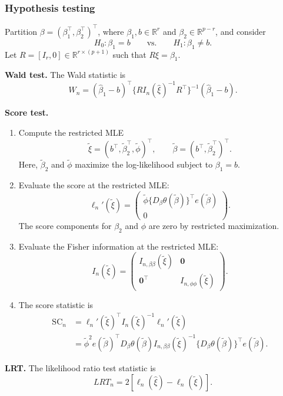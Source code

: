 \documentclass{article}
\theoremstyle{break}
\newcommand{\R}{\ensuremath{\mathbb{R}}}
\begin{document}
\subsubsection{Hypothesis testing}
Partition $\beta=(\beta_1^\top,\beta_2^\top)^\top$, where $\beta_1,b\in\R^r$ and $\beta_2\in\R^{p-r}$, and consider
\[
  H_0:\beta_1=b
  \qquad\text{vs.}\qquad
  H_1:\beta_1\ne b.
\]
Let $R=[I_r,0] \in \R^{r \times (p+1)}$ such that $R\xi=\beta_1$.

\textbf{Wald test.} The Wald statistic is
\[
  W_n=(\hat\beta_1-b)^\top
  \{R I_n(\hat\xi)^{-1}R^\top\}^{-1}
  (\hat\beta_1-b).
\]

\textbf{Score test.}
\begin{enumerate}
  \item Compute the restricted MLE
  \[
    \tilde\xi=(b^\top,\tilde\beta_2^\top,\tilde\phi)^\top,
    \qquad
    \tilde\beta=(b^\top,\tilde\beta_2^\top)^\top.
  \]
  Here, $\tilde\beta_2$ and $\tilde\phi$ maximize the log-likelihood subject to $\beta_1=b$.
  \item Evaluate the score at the restricted MLE:
  \[
    \ell_n'(\tilde\xi)
    =\begin{pmatrix}
      \tilde\phi\{D_\beta\theta(\tilde\beta)\}^\top e(\tilde\beta) \\
      0
    \end{pmatrix}.
  \]
  The score components for $\beta_2$ and $\phi$ are zero by restricted maximization.
  \item Evaluate the Fisher information at the restricted MLE:
  \[
    I_n(\tilde\xi)=
    \begin{pmatrix}
      I_{n,\beta\beta}(\tilde\xi) & \mathbf{0} \\
      \mathbf{0}^\top & I_{n,\phi\phi}(\tilde\xi)
    \end{pmatrix}.
  \]
  \item The score statistic is
  \begin{align*}
    \mathrm{SC}_n
    &=\ell_n'(\tilde\xi)^\top I_n(\tilde\xi)^{-1}\ell_n'(\tilde\xi) \\
    &=\tilde\phi^2 e(\tilde\beta)^\top D_\beta\theta(\tilde\beta)
    I_{n,\beta\beta}(\tilde\xi)^{-1}
    \{D_\beta\theta(\tilde\beta)\}^\top e(\tilde\beta).
  \end{align*}
\end{enumerate}

\textbf{LRT.} The likelihood ratio test statistic is
\[
LRT_n = 2[\ell_n(\hat\xi) - \ell_n(\tilde\xi)].
\]
\end{document}
